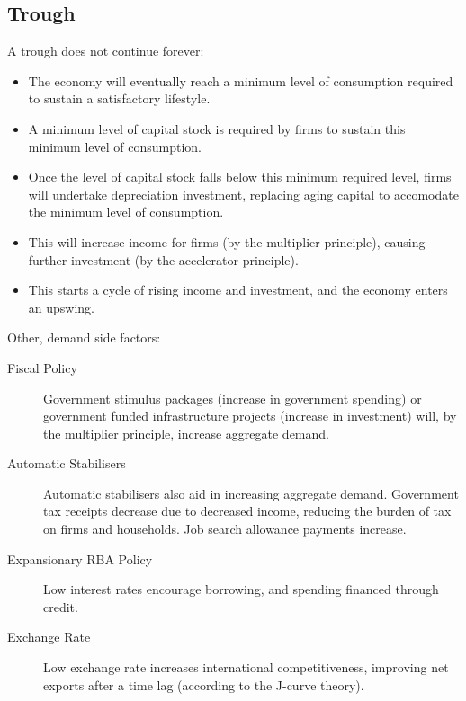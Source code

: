 \documentclass[a4paper,11pt]{article}
\begin{document}
\subsection{Trough}

A trough does not continue forever:

\begin{itemize}
\item The economy will eventually reach a minimum level of consumption required
	to sustain a satisfactory lifestyle.
\item A minimum level of capital stock is required by firms to sustain this
	minimum level of consumption.
\item Once the level of capital stock falls below this minimum required level,
	firms will undertake depreciation investment, replacing aging capital to
	accomodate the minimum level of consumption.
\item This will increase income for firms (by the multiplier principle), causing
	further investment (by the accelerator principle).
\item This starts a cycle of rising income and investment, and the economy
	enters an upswing.
\end{itemize}

Other, demand side factors:

\begin{description}
\item [Fiscal Policy] Government stimulus packages (increase in government
	spending) or government funded infrastructure projects (increase in
	investment) will, by the multiplier principle, increase aggregate demand.
\item [Automatic Stabilisers] Automatic stabilisers also aid in increasing
	aggregate demand. Government tax receipts decrease due to decreased income,
	reducing the burden of tax on firms and households. Job search allowance
	payments increase.
\item [Expansionary RBA Policy] Low interest rates encourage borrowing, and
	spending financed through credit.
\item [Exchange Rate] Low exchange rate increases international competitiveness,
	improving net exports after a time lag (according to the J-curve theory).
\end{description}
\end{document}
